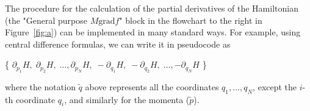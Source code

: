 \documentclass{iopart}
\begin{document}
The procedure for the calculation of the partial derivatives of the Hamiltonian
(the "General purpose $M\text{grad} f$" block in the flowchart to the right in
Figure~\ref{fig:a}) can be implemented in many standard ways. For example, using
central difference formulas, we can write it in pseudocode as\\
\begin{algorithm}[H]
  \Return
  \{
    $\partial_{p_1}H,\; \partial_{p_2}H,\;\ldots, \partial_{p_N}H,\;
    -\partial_{q_1}H,\; -\partial_{q_2}H,\;\ldots, -\partial_{q_N}H$
  \}
  
\end{algorithm}
\noindent
where the notation $\tilde q$ above represents all the coordinates
$q_1, \ldots, q_N$, except the $i$-th coordinate $q_i$, and similarly for the
momenta ($\tilde p$).
\end{document}

